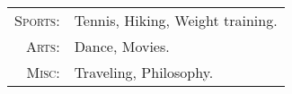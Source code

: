 %
%



\begin{tabular}{rl}
    \textsc{Sports:} & Tennis, Hiking, Weight training.\\
    \textsc{Arts:} & Dance, Movies.\\
    \textsc{Misc:} & Traveling, Philosophy.\\
\end{tabular}
